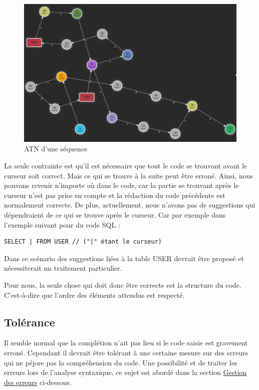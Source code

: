 \documentclass[
    iict, %
    il, %
]{heig-tb}
\begin{document}
\begin{figure}[!h]
    \begin{center}
        \includegraphics[width=12cm]{assets/figures/seq_ATN.png}
    \end{center}
    \caption[ATN d'une séquence]{\label{seq_ATN} ATN d'une séquence}
\end{figure}

La seule contrainte est qu'il est nécessaire que tout le code se trouvant avant le curseur soit correct. Mais ce qui se trouve à la suite peut être erroné.
Ainsi, nous pouvons revenir n'importe où dans le code, car la partie se trouvant après le curseur n'est pas prise en compte et la rédaction du code précédente est normalement correcte.
De plus, actuellement, nous n'avons pas de suggestions qui dépendraient de ce qui se trouve après le curseur.
Car par exemple dans l'exemple suivant pour du code SQL :

\begin{lstlisting}[frame=single]
SELECT | FROM USER // ("|" étant le curseur)
\end{lstlisting}

Dans ce scénario des suggestions liées à la table USER devrait être proposé et nécessiterait un traitement particulier.

Pour nous, la seule chose qui doit donc être correcte est la structure du code. C'est-à-dire que l'ordre des éléments attendus est respecté.

\subsection{Tolérance}
Il semble normal que la complétion n'ait pas lieu si le code saisie est gravement erroné.
Cependant il devrait être tolérant à une certaine mesure sur des erreurs qui ne péjore pas la compréhension du code.
Une possibilité et de traiter les erreurs lors de l'analyse syntaxique, ce sujet est abordé dans la section \hyperref[error handle]{Gestion des erreurs} ci-dessous.
\end{document}

